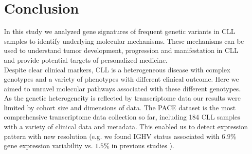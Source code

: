 
\section{Conclusion}

In this study we analyzed gene signatures of frequent genetic variants in CLL samples to identify underlying molecular mechanisms. These mechanisms can be used to understand tumor development, progression and manifestation in CLL and provide potential targets of personalized medicine.\\

Despite clear clinical markers, CLL is a heterogeneous disease with complex genotypes and a variety of phenotypes with different clinical outcome. Here we aimed to unravel molecular pathways associated with these different genotypes. As the genetic heterogeneity is reflected by transcriptome data our results were limited by cohort size and dimensions of data. The PACE dataset is the most comprehensive transcriptome data collection so far, including 184 CLL samples with a variety of clinical data and metadata. This enabled us to detect expression pattern with new resolution (e.g. we found IGHV status associated with $6.9\%$ gene expression variability vs. $1.5\%$ in previous studies \citep{Ferreira2014}).\\   

